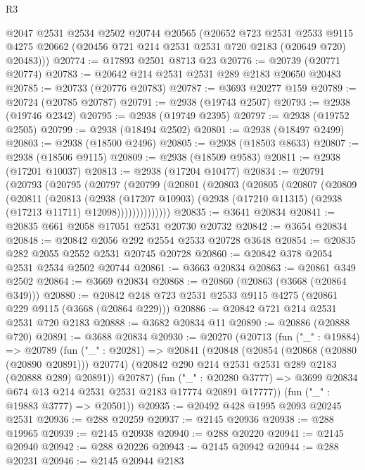 \begin{lexlean}{R3}
\begin{coremodule}
      @2047
      @2531
      @2534
      @2502
      @20744
      @20565
      (@20652
        @723
        @2531
        @2533
        @9115
        @4275
        @20662
        (@20456 @721 @214 @2531 @2531 @720 @2183 (@20649 @720) @20483)))
@20774 := @17893 @2501 @8713 @23
@20776 := @20739 (@20771 @20774)
@20783 := @20642 @214 @2531 @2531 @289 @2183 @20650 @20483
@20785 := @20733 (@20776 @20783)
@20787 := @3693 @20277 @159
@20789 := @20724 (@20785 @20787)
@20791 := @2938 (@19743 @2507)
@20793 := @2938 (@19746 @2342)
@20795 := @2938 (@19749 @2395)
@20797 := @2938 (@19752 @2505)
@20799 := @2938 (@18494 @2502)
@20801 := @2938 (@18497 @2499)
@20803 := @2938 (@18500 @2496)
@20805 := @2938 (@18503 @8633)
@20807 := @2938 (@18506 @9115)
@20809 := @2938 (@18509 @9583)
@20811 := @2938 (@17201 @10037)
@20813 := @2938 (@17204 @10477)
@20834 := @20791
    (@20793
      (@20795
        (@20797
          (@20799
            (@20801
              (@20803
                (@20805
                  (@20807
                    (@20809
                      (@20811
                        (@20813
                          (@2938
                            (@17207 @10903)
                            (@2938 (@17210 @11315) (@2938 (@17213 @11711) @12098))))))))))))))
@20835 := @3641 @20834
@20841 := @20835 @661 @2058 @17051 @2531 @20730 @20732
@20842 := @3654 @20834
@20848 := @20842 @2056 @292 @2554 @2533 @20728 @3648
@20854 := @20835 @282 @2055 @2552 @2531 @20745 @20728
@20860 := @20842 @378 @2054 @2531 @2534 @2502 @20744
@20861 := @3663 @20834
@20863 := @20861 @349 @2502
@20864 := @3669 @20834
@20868 := @20860 (@20863 (@3668 (@20864 @349)))
@20880 := @20842 @248 @723 @2531 @2533 @9115 @4275 (@20861 @229 @9115 (@3668 (@20864 @229)))
@20886 := @20842 @721 @214 @2531 @2531 @720 @2183
@20888 := @3682 @20834 @11
@20890 := @20886 (@20888 @720)
@20891 := @3688 @20834
@20930 := @20270
    (@20713
      (fun ("_" : @19884) =>
      @20789
        (fun ("_" : @20281) =>
        @20841
          (@20848
            (@20854 (@20868 (@20880 (@20890 @20891))) @20774)
            (@20842 @290 @214 @2531 @2531 @289 @2183 (@20888 @289) @20891))
          @20787)
        (fun ("_" : @20280 @3777) =>
        @3699 @20834 @674 @13 @214 @2531 @2531 @2183 @17774 @20891 @17777))
      (fun ("_" : @19883 @3777) => @20501))
@20935 := @20492 @428 @1995 @2093 @20245 @2531
@20936 := @288 @20259
@20937 := @2145 @20936
@20938 := @288 @19965
@20939 := @2145 @20938
@20940 := @288 @20220
@20941 := @2145 @20940
@20942 := @288 @20226
@20943 := @2145 @20942
@20944 := @288 @20231
@20946 := @2145 @20944 @2183

\end{coremodule}
\end{lexlean}
